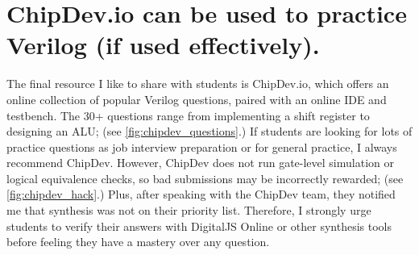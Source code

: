 \FloatBarrier

\section{ChipDev.io can be used to practice Verilog (if used effectively).}




The final resource I like to share with students is ChipDev.io, which offers an online collection of popular Verilog questions, paired with an online IDE and testbench. The 30+ questions range from implementing a shift register to designing an ALU; (see \autoref{fig:chipdev_questions}.) If students are looking for lots of practice questions as job interview preparation or for general practice, I always recommend ChipDev. However, ChipDev does not run gate-level simulation or logical equivalence checks, so bad submissions may be incorrectly rewarded; (see \autoref{fig:chipdev_hack}.) Plus, after speaking with the ChipDev team, they notified me that synthesis was not on their priority list. Therefore, I strongly urge students to verify their answers with DigitalJS Online or other synthesis tools before feeling they have a mastery over any question.

